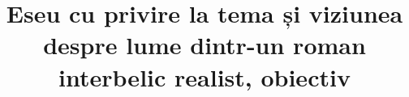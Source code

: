

\title{Eseu cu privire la tema și viziunea despre lume dintr-un roman interbelic realist, obiectiv}


 \maketitle %
 

